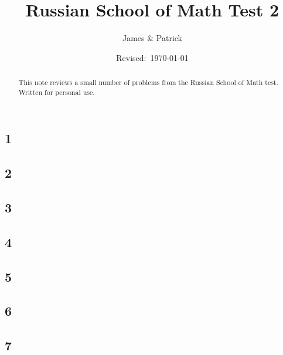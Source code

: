 \documentclass[12pt]{article}
\title{Russian School of Math Test 2}
\author{James \& Patrick}
\date{Revised:~\today}
\newif\ifsolution\solutiontrue%
\newif\ifanswer\answertrue%
\begin{document}
\maketitle
\begin{abstract}\setlength{\parindent}{0pt}%
This note reviews a small number of problems from the Russian School of Math test. Written for personal use.
\end{abstract}

\thispagestyle{empty}
\clearpage

\subsection*{1}

\ifsolution
  

  \bigskip
  
\fi

\subsection*{2}

\ifsolution
  
\fi

\subsection*{3}

\ifsolution
  
\fi

\subsection*{4}

\ifsolution
  
\fi

\subsection*{5}

\ifsolution
  
\fi

\subsection*{6}

\ifsolution
  
\fi

\subsection*{7}

\ifsolution
  
\fi
\end{document}
